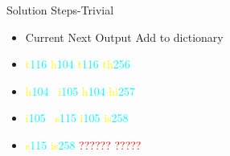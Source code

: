 \documentclass{beamer}
\begin{document}
\begin{frame}{Solution Steps-Trivial}
      \centering
    \begin{itemize}
        \item <1-> \quad\quad Current \quad\quad\quad\quad Next \quad\quad\quad\quad Output \quad\quad\quad\quad Add to dictionary
    \item <1-> \quad\quad \textcolor{yellow}{t}\:\textcolor{cyan}{116} \quad\quad\quad\qquad\: \textcolor{yellow}{h}\:\textcolor{cyan}{104} \quad\quad\qquad \textcolor{yellow}{t}\:\textcolor{cyan}{116} \quad\quad\quad\qquad\: \textcolor{yellow}{th}\:\textcolor{cyan}{256}
    \item <2-> \quad\quad \textcolor{yellow}{h}\:\textcolor{cyan}{104} \quad\quad\quad\qquad\, \textcolor{yellow}{i}\:\textcolor{cyan}{105} \quad\quad\qquad \textcolor{yellow}{h}\:\textcolor{cyan}{104} \quad\quad\quad\qquad\: \textcolor{yellow}{hi}\:\textcolor{cyan}{257}
    \item <3-> \quad\quad \textcolor{yellow}{i}\:\textcolor{cyan}{105} \quad\quad\quad\qquad\;\, \textcolor{yellow}{s}\:\textcolor{cyan}{115} \quad\quad\qquad \textcolor{yellow}{i}\:\textcolor{cyan}{105} \quad\quad\quad\qquad\; \textcolor{yellow}{is}\:\textcolor{cyan}{258}
    \item <4-> \quad\quad \textcolor{yellow}{s}\:\textcolor{cyan}{115} \quad\quad\quad\qquad\; \textcolor{yellow}{is}\:\textcolor{cyan}{258} \quad\quad\qquad \textcolor{red}{???}\:\textcolor{red}{???} \quad\quad\quad\qquad\: \textcolor{red}{??}\:\textcolor{red}{???}



\end{itemize}
\end{frame}
\end{document}
